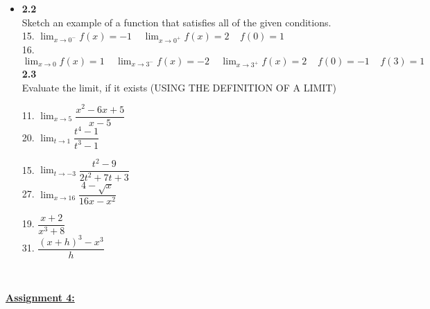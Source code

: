 \documentclass{letter}
\begin{document}
	\begin{itemize}
		\item[] \textbf{2.2}\\
		
		Sketch an example of a function that satisfies all of the given conditions.\\
		15. $\displaystyle \lim_{x \to 0^-} f(x) = -1 \;\;\;\; \lim_{x \to 0^+} f(x) = 2 \;\;\;\; f(0) = 1$\\
		16. $\displaystyle \lim_{x \to 0} f(x) = 1 \;\;\;\; \lim_{x \to 3^-} f(x) = -2 \;\;\;\; \lim_{x \to 3^+} f(x) = 2 \;\;\;\; f(0) = -1 \;\;\;\; f(3) = 1$\\
		
		\textbf{2.3}\\
		
		Evaluate the limit, if it exists (USING THE DEFINITION OF A LIMIT)\\
		\begin{minipage}[t]{0.3\textwidth}
			11. $\displaystyle \lim_{x \to 5} \dfrac{x^2 - 6x + 5}{x-5}$\\
			20. $\displaystyle \lim_{t \to 1} \dfrac{t^4 - 1}{t^3 - 1}$
		\end{minipage}
		\begin{minipage}[t]{0.3\textwidth}
			15. $\displaystyle \lim_{t \to -3} \dfrac{t^2 - 9}{2t^2 + 7t + 3}$\\
			27. $\displaystyle \lim_{x \to 16} \dfrac{4 - \sqrt x}{16x - x^2}$
		\end{minipage}
		\begin{minipage}[t]{0.3\textwidth}
			19. $\displaystyle \dfrac{x+2}{x^3 + 8}$\\
			31. $\displaystyle \dfrac{(x+h)^3 - x^3}{h}$
		\end{minipage}\\
	\end{itemize}
	\clearpage
	\large\underline{\textbf{Assignment 4:}}
\end{document}

